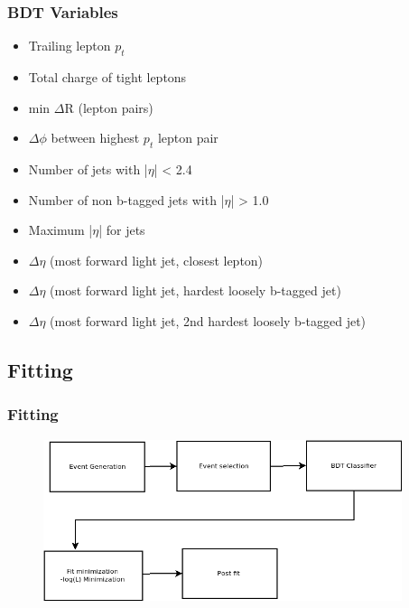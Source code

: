 \documentclass[11pt]{beamer}
\begin{document}
\begin{frame}
\frametitle{BDT Variables}
\begin{itemize}
\item	Trailing lepton $p_{t}$
\item 	Total charge of tight leptons
\item 	min $\Delta$R (lepton pairs)
\item 	$\Delta\phi$ between highest $p_t$ lepton pair
\item 	Number of jets with |$\eta$| < 2.4
\item	Number of non b-tagged jets with |$\eta$| > 1.0
\item	Maximum |$\eta$| for jets
\item	$\Delta\eta$ (most forward light jet, closest lepton)
\item	$\Delta\eta$ (most forward light jet, hardest loosely b-tagged jet)
\item	$\Delta\eta$ (most forward light jet, 2nd hardest loosely b-tagged jet)
\end{itemize}
\end{frame}


\begin{frame}
\section{Fitting}
\frametitle{Fitting}
	\begin{center}
	\begin{figure}
		\includegraphics[width=10.5cm]{figures/fit-box.png}
		\caption*{}
	\end{figure}
\end{center}
\end{frame}
\end{document}
